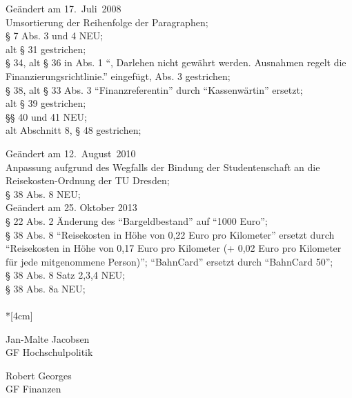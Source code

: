 Geändert am 17.~Juli~2008\\
Umsortierung der Reihenfolge der Paragraphen;\\
§ 7 Abs. 3 und 4 NEU;\\
alt § 31 gestrichen;\\
§ 34, alt § 36 in Abs. 1 "`, Darlehen nicht gewährt werden. Ausnahmen regelt die Finanzierungsrichtlinie."' eingefügt, Abs. 3 gestrichen;\\
§ 38, alt § 33 Abs. 3 "`Finanzreferentin"' durch "`Kassenwärtin"' ersetzt;\\
alt § 39 gestrichen;\\
§§ 40 und 41 NEU;\\
alt Abschnitt 8, § 48 gestrichen;

Geändert am 12.~August~2010\\
Anpassung aufgrund des Wegfalls der Bindung der Studentenschaft an die Reisekosten-Ordnung der TU Dresden;\\
§ 38 Abs. 8 NEU;\\


Geändert am 25. Oktober 2013\\
§ 22 Abs. 2 Änderung des "`Bargeldbestand"' auf "`1000 Euro"';\\
§ 38 Abs. 8 "`Reisekosten in Höhe von 0,22 Euro pro Kilometer"' ersetzt durch "`Reisekosten in Höhe von 0,17 Euro pro Kilometer (+ 0,02 Euro pro Kilometer für jede mitgenommene Person)"'; "`BahnCard"' ersetzt durch "`BahnCard 50"';\\
§ 38 Abs. 8 Satz 2,3,4 NEU;\\
§ 38 Abs. 8a NEU;\\

\normalsize
~\\*[4cm]
\begin{center}
\hspace*{\fill}
\parbox{7cm}{Jan-Malte Jacobsen\\GF Hochschulpolitik}
\hfill\parbox{7cm}{Robert Georges\\GF Finanzen}
\hspace*{\fill}
\end{center}
